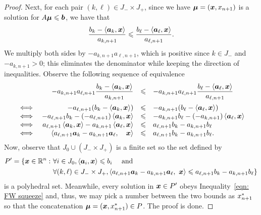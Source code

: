 \begin{proof}
Next, for each pair $(k, \ell)\in J_-\times J_+$, since we have ${\boldsymbol\mu} = ({\boldsymbol x}, x_{n+1})$ is a solution for $A\boldsymbol\mu \leqslant {\boldsymbol b}$, we have that 
\begin{equation} \label{eqn: FW squeeze} \frac{b_k - \left\langle{\boldsymbol a}_k, {\boldsymbol x}\right\rangle}{a_{k, n+1}} \leqslant \frac{b_\ell - \left\langle{\boldsymbol a}_\ell, {\boldsymbol x}\right\rangle}{a_{\ell, n+1}}. \end{equation}
We multiply both sides by $-a_{k, n+1}a_{\ell, n+1}$, which is positive since $k \in J_-$ and $-a_{k, n+1} > 0$; this eliminates the denominator while keeping the direction of inequalities. Observe the following sequence of equivalence
\[\begin{array}{crcl}\vspace{.5em}
& {\displaystyle -a_{k, n+1}a_{\ell, n+1}\frac{b_k - \inner{\bma_k, \bmx}}{a_{k, n+1}}} & \leq & {\displaystyle -a_{k, n+1}a_{\ell, n+1}\frac{b_\ell - \inner{\bma_\ell, \bmx}}{a_{\ell, n+1}}} \\
\iff  &   -a_{\ell, n+1}(b_k - \inner{\bma_k, \bmx}) & \leq & -a_{k, n+1}(b_\ell - \inner{\bma_\ell, \bmx}) \\
\iff  & -a_{\ell, n+1}b_k - (-a_{\ell, n+1}) \inner{\bma_k, \bmx} & \leq & -a_{k, n+1}b_\ell - (-a_{k, n+1}) \inner{\bma_\ell, \bmx} \\
\iff  &  a_{\ell, n+1} \inner{\bma_k, \bmx} -a_{k, n+1} \inner{\bma_\ell, \bmx} & \leq &  a_{\ell, n+1}b_k -a_{k, n+1}b_\ell  \\
\iff  & \inner{ a_{\ell, n+1} \bma_k  -a_{k, n+1}\bma_\ell, \quad \bmx} & \leq &  a_{\ell, n+1}b_k -a_{k, n+1}b_\ell . \\
\end{array}\]
Now, observe that $J_0 \cup (J_-\times J_+)$ is a finite set so the set defined by 
\begin{equation}\label{eqn: FM poly}\begin{split} 
P' = \{ {\boldsymbol x}\in\mathbb R^n :~&\forall i\in J_0, \left\langle{\boldsymbol a}_i, {\boldsymbol x}\right\rangle\leqslant b_i \quad\text{ and } \\
~& \forall (k, \ell)\in J_-\times J_+, \left\langle a_{\ell, n+1} {\boldsymbol a}_k  -a_{k, n+1}{\boldsymbol a}_\ell, \ {\boldsymbol x}\right\rangle \leqslant a_{\ell, n+1}b_k -a_{k, n+1}b_\ell \}  
 \end{split}\end{equation} is a polyhedral set. Meanwhile, every solution in ${\boldsymbol x} \in P'$ obeys Inequality~\ref{eqn: FW squeeze} and, thus, we may pick a number between the two bounds as $x_{n+1}^\ast$ so that the concatenation ${\boldsymbol\mu} = ({\boldsymbol x}, x_{n+1}^\ast)\in P$. The proof is done.  
\end{proof}

